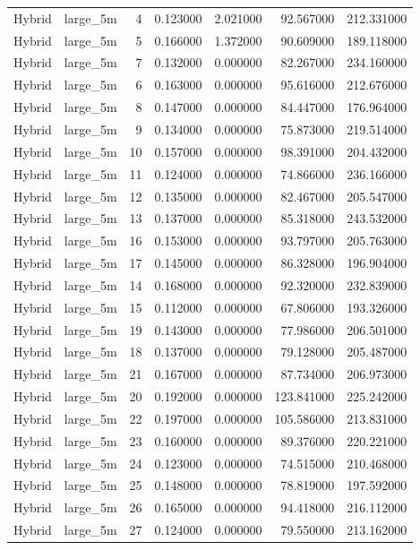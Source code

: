 \begin{tabular}{llrrrrr}
Hybrid & large_5m & 4 & 0.123000 & 2.021000 & 92.567000 & 212.331000 \\
Hybrid & large_5m & 5 & 0.166000 & 1.372000 & 90.609000 & 189.118000 \\
Hybrid & large_5m & 7 & 0.132000 & 0.000000 & 82.267000 & 234.160000 \\
Hybrid & large_5m & 6 & 0.163000 & 0.000000 & 95.616000 & 212.676000 \\
Hybrid & large_5m & 8 & 0.147000 & 0.000000 & 84.447000 & 176.964000 \\
Hybrid & large_5m & 9 & 0.134000 & 0.000000 & 75.873000 & 219.514000 \\
Hybrid & large_5m & 10 & 0.157000 & 0.000000 & 98.391000 & 204.432000 \\
Hybrid & large_5m & 11 & 0.124000 & 0.000000 & 74.866000 & 236.166000 \\
Hybrid & large_5m & 12 & 0.135000 & 0.000000 & 82.467000 & 205.547000 \\
Hybrid & large_5m & 13 & 0.137000 & 0.000000 & 85.318000 & 243.532000 \\
Hybrid & large_5m & 16 & 0.153000 & 0.000000 & 93.797000 & 205.763000 \\
Hybrid & large_5m & 17 & 0.145000 & 0.000000 & 86.328000 & 196.904000 \\
Hybrid & large_5m & 14 & 0.168000 & 0.000000 & 92.320000 & 232.839000 \\
Hybrid & large_5m & 15 & 0.112000 & 0.000000 & 67.806000 & 193.326000 \\
Hybrid & large_5m & 19 & 0.143000 & 0.000000 & 77.986000 & 206.501000 \\
Hybrid & large_5m & 18 & 0.137000 & 0.000000 & 79.128000 & 205.487000 \\
Hybrid & large_5m & 21 & 0.167000 & 0.000000 & 87.734000 & 206.973000 \\
Hybrid & large_5m & 20 & 0.192000 & 0.000000 & 123.841000 & 225.242000 \\
Hybrid & large_5m & 22 & 0.197000 & 0.000000 & 105.586000 & 213.831000 \\
Hybrid & large_5m & 23 & 0.160000 & 0.000000 & 89.376000 & 220.221000 \\
Hybrid & large_5m & 24 & 0.123000 & 0.000000 & 74.515000 & 210.468000 \\
Hybrid & large_5m & 25 & 0.148000 & 0.000000 & 78.819000 & 197.592000 \\
Hybrid & large_5m & 26 & 0.165000 & 0.000000 & 94.418000 & 216.112000 \\
Hybrid & large_5m & 27 & 0.124000 & 0.000000 & 79.550000 & 213.162000 \\

\end{tabular}
